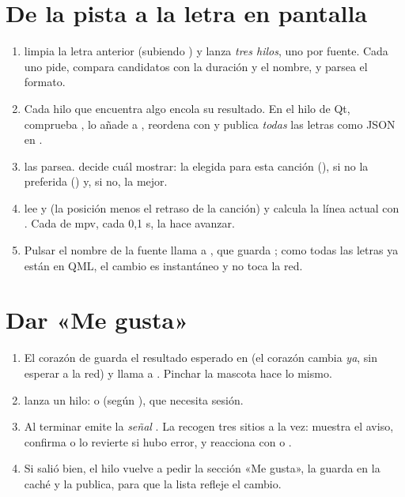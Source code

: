 \section{De la pista a la letra en pantalla}

\begin{enumerate}
  \item {} limpia la letra anterior (subiendo ) y
  lanza \emph{tres hilos}, uno por fuente. Cada uno pide, compara candidatos con la duración y
  el nombre, y parsea el formato.
  \item Cada hilo que encuentra algo encola su resultado. En el hilo de Qt, 
  comprueba , lo añade a , reordena con
   y publica \emph{todas} las letras como JSON en .
  \item {} las parsea.  decide cuál mostrar: la
  elegida para esta canción (), si no la preferida () y, si
  no, la mejor.
  \item {} lee  y 
  (la posición menos el retraso de la canción) y calcula la línea actual con
  . Cada  de mpv, cada 0,1 s, la hace avanzar.
  \item Pulsar el nombre de la fuente llama a , que guarda
  ; como todas las letras ya están en QML, el cambio es instantáneo y no
  toca la red.
\end{enumerate}

\section{Dar «Me gusta»}

\begin{enumerate}
  \item El corazón de  guarda el resultado esperado en
   (el corazón cambia \emph{ya}, sin esperar a la red) y llama a
  . Pinchar la mascota hace lo mismo.
  \item {} lanza un hilo:  o  (según
  ), que necesita sesión.
  \item Al terminar emite la \emph{señal} . La
  recogen tres sitios a la vez:  muestra el aviso,
   confirma  o lo revierte si hubo error, y
   reacciona con  o .
  \item Si salió bien, el hilo vuelve a pedir la sección «Me gusta», la guarda en la caché y
  la publica, para que la lista refleje el cambio.
\end{enumerate}

